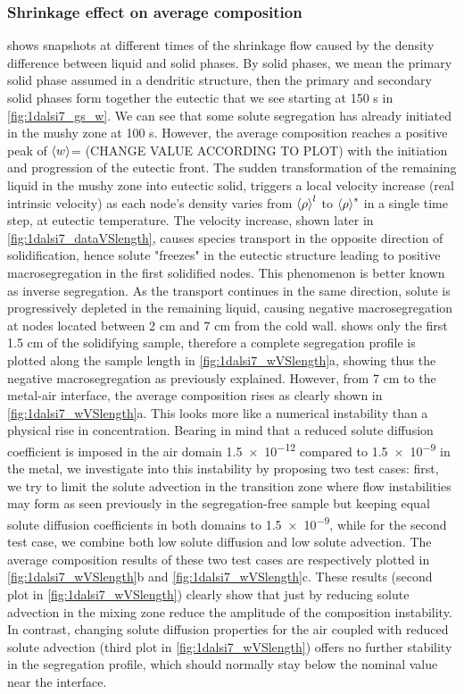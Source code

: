 \subsubsection{Shrinkage effect on average composition}
 shows snapshots at different times of the shrinkage flow caused by the density difference between liquid and solid phases.
By solid phases, we mean the primary solid phase assumed in a dendritic structure, then the primary and secondary solid phases form together the eutectic
that we see starting at 150 s in \cref{fig:1dalsi7_gs_w}. We can see that some solute segregation has already initiated in the mushy zone at 100 s.
However, the average composition reaches a positive peak of $\left \langle w \right \rangle$= (CHANGE VALUE ACCORDING TO PLOT) with the initiation and progression of the eutectic front.
The sudden transformation of the remaining liquid in the mushy zone into eutectic solid, triggers a local velocity increase (real intrinsic velocity)
as each node's density varies from $\left \langle \rho \right \rangle^l$ to $\left \langle \rho \right \rangle^s$ in a single time step, at eutectic temperature. The velocity increase, shown later in \cref{fig:1dalsi7_dataVSlength},
causes species transport in the opposite direction of solidification, hence solute "freezes" in the eutectic structure leading to positive macrosegregation
in the first solidified nodes. This phenomenon is better known as inverse segregation. 
As the transport continues in the same direction, 
solute is progressively depleted in the remaining liquid, causing negative macrosegregation at nodes located between 2 cm and 7 cm from the cold wall.
 shows only the first 1.5 cm of the solidifying sample, therefore a complete segregation profile is plotted along the sample length in \cref{fig:1dalsi7_wVSlength}a,
showing thus the negative macrosegregation as previously explained.
However, from 7 cm to the metal-air interface, the average composition rises as clearly shown in \cref{fig:1dalsi7_wVSlength}a. This looks more like a numerical
instability than a physical rise in concentration. 
Bearing in mind that a reduced solute diffusion coefficient is imposed in the air domain \SI{1.5e-12}{\udiffusivity} compared to 
\SI{1.5e-9}{\udiffusivity} in the metal, we investigate into this instability by proposing two test cases: first, we try to limit the solute advection in the transition
zone where flow instabilities may form as seen previously in the segregation-free sample but keeping equal solute diffusion coefficients in both domains to \SI{1.5e-9}{\udiffusivity},
while for the second test case, we combine both low solute diffusion and low solute advection. The average composition results of these two test cases
are respectively plotted in \cref{fig:1dalsi7_wVSlength}b and \cref{fig:1dalsi7_wVSlength}c.
These results (second plot in \cref{fig:1dalsi7_wVSlength})  clearly show that just by reducing solute advection in the mixing zone reduce the amplitude of the composition instability.
In contrast, changing solute diffusion properties for the air coupled with reduced solute advection (third plot in \cref{fig:1dalsi7_wVSlength}) offers no further stability
in the segregation profile, which should normally stay below the nominal value near the interface.


